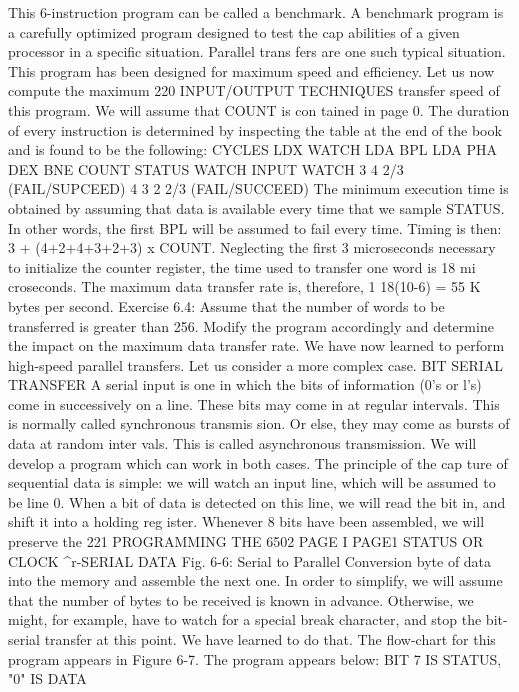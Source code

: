 \documentclass{book}
\begin{document}
This 6-instruction program can be called a benchmark. A benchmark
program is a carefully optimized program designed to test the cap
abilities of a given processor in a specific situation. Parallel trans
fers are one such typical situation. This program has been designed
for maximum speed and efficiency. Let us now compute the maximum
220
INPUT/OUTPUT TECHNIQUES
transfer speed of this program. We will assume that COUNT is con
tained in page 0. The duration of every instruction is determined by
inspecting the table at the end of the book and is found to be the
following:
CYCLES
LDX
WATCH LDA
BPL
LDA
PHA
DEX
BNE
COUNT
STATUS
WATCH
INPUT
WATCH
3
4
2/3 (FAIL/SUPCEED)
4
3
2
2/3 (FAIL/SUCCEED)
The minimum execution time is obtained by assuming that
data is available every time that we sample STATUS. In other
words, the first BPL will be assumed to fail every time. Timing is
then: 3 + (4+2+4+3+2+3) x COUNT.
Neglecting the first 3 microseconds necessary to initialize the
counter register, the time used to transfer one word is 18 mi
croseconds.
The maximum data transfer rate is, therefore,
1
18(10-6)
= 55 K bytes per second.
Exercise 6.4: Assume that the number of words to be transferred
is greater than 256. Modify the program accordingly and determine
the impact on the maximum data transfer rate.
We have now learned to perform high-speed parallel transfers.
Let us consider a more complex case.
BIT SERIAL TRANSFER
A serial input is one in which the bits of information (0's or
l's) come in successively on a line. These bits may come in at
regular intervals. This is normally called synchronous transmis
sion. Or else, they may come as bursts of data at random inter
vals. This is called asynchronous transmission. We will develop a
program which can work in both cases. The principle of the cap
ture of sequential data is simple: we will watch an input line,
which will be assumed to be line 0. When a bit of data is detected
on this line, we will read the bit in, and shift it into a holding reg
ister. Whenever 8 bits have been assembled, we will preserve the
221
PROGRAMMING THE 6502
PAGE I
PAGE1
STATUS OR CLOCK
^r-SERIAL DATA
Fig. 6-6: Serial to Parallel Conversion
byte of data into the memory and assemble the next one. In order
to simplify, we will assume that the number of bytes to be received
is known in advance. Otherwise, we might, for example, have to
watch for a special break character, and stop the bit-serial
transfer at this point. We have learned to do that. The flow-chart
for this program appears in Figure 6-7. The program appears
below:
BIT 7 IS STATUS, "0" IS DATA
\end{document}
